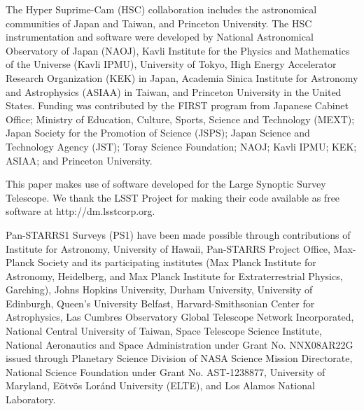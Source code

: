 \documentclass[useamsfonts]{pasj01}
\begin{document}
\begin{ack}
    \label{sec:ack}

    The Hyper Suprime-Cam (HSC) collaboration includes the astronomical communities of
    Japan and Taiwan, and Princeton University.
    The HSC instrumentation and software were developed by National Astronomical
    Observatory of Japan (NAOJ), Kavli Institute for the Physics and Mathematics of
    the Universe (Kavli IPMU), University of Tokyo, High Energy Accelerator
    Research Organization (KEK) in Japan,  Academia Sinica Institute for Astronomy and
    Astrophysics  (ASIAA) in Taiwan, and Princeton University in the United States.
    Funding was contributed by the FIRST program from Japanese Cabinet Office; Ministry of Education, Culture, Sports, Science and Technology (MEXT); Japan
    Society for the Promotion of Science (JSPS); Japan Science and Technology Agency
    (JST); Toray Science  Foundation; NAOJ; Kavli IPMU; KEK; ASIAA; and Princeton University.

    This paper makes use of software developed for the Large Synoptic Survey Telescope.
    We thank the LSST Project for making their code available as free software at
    http://dm.lsstcorp.org.

    Pan-STARRS1 Surveys (PS1) have been made possible through contributions of 
    Institute for Astronomy, University of Hawaii, Pan-STARRS Project Office,
    Max-Planck Society and its participating institutes (Max Planck Institute
    for Astronomy, Heidelberg, and Max Planck Institute for Extraterrestrial Physics,
    Garching), Johns Hopkins University, Durham University, University of
    Edinburgh, Queen's University Belfast, Harvard-Smithsonian Center for Astrophysics,
    Las Cumbres Observatory Global Telescope Network Incorporated,  National
    Central University of Taiwan, Space Telescope Science Institute,  National
    Aeronautics and Space Administration under Grant No.
    NNX08AR22G issued through Planetary Science Division of NASA Science
    Mission Directorate, National Science Foundation under Grant No. AST-1238877,
    University of Maryland, Eötvös Loránd University (ELTE), and Los Alamos
    National Laboratory.


\end{ack}
\end{document}
